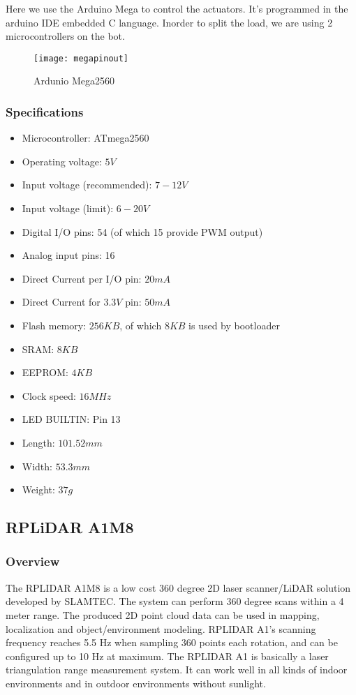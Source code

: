 Here we use the Arduino Mega to control the actuators. It's programmed in the arduino IDE embedded C language. Inorder to split the load, we are using  2 microcontrollers on the bot.
\begin{figure}[H]
    \centering
        \texttt{[image: megapinout]}
        \caption{Ardunio Mega2560}
        \label{fig:megapinout}
\end{figure}

\subsubsection{Specifications}
\begin{itemize}
    \item Microcontroller: ATmega2560
    \item Operating voltage: \(5V\)
    \item Input voltage (recommended): \(7-12V\)
    \item Input voltage (limit): \(6-20V\)
    \item Digital I/O pins: 54 (of which 15 provide PWM output)
    \item Analog input pins: 16
    \item Direct Current per I/O pin: \(20 mA\)
    \item Direct Current for \(3.3V\) pin: \(50 mA\)
    \item Flash memory: \(256 KB\), of which \(8 KB\) is used by bootloader
    \item SRAM: \(8 KB\)
    \item EEPROM: \(4 KB\)
    \item Clock speed: \(16 MHz\)
    \item LED BUILTIN: Pin 13
    \item Length: \(101.52 mm\)
    \item Width: \(53.3 mm\)
    \item Weight: \(37 g\)
\end{itemize}

\newpage
\subsection{RPLiDAR A1M8}
\subsubsection{Overview}

The RPLIDAR A1M8 is a low cost 360 degree 2D laser scanner/LiDAR solution developed by SLAMTEC. The system can perform 360 degree scans within a 4 meter range. The produced 2D point cloud data can be used in mapping, localization and object/environment modeling. RPLIDAR A1's scanning frequency reaches 5.5 Hz when sampling 360 points each rotation, and can be configured up to 10 Hz at maximum. The RPLIDAR A1 is basically a laser triangulation range measurement system. It can work well in all kinds of indoor environments and in outdoor environments without sunlight.

